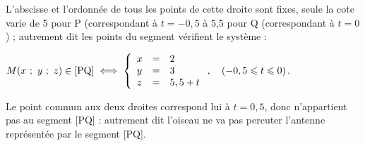 \begin{enumerate}
L'abscisse et l'ordonnée de tous les points de cette droite sont fixes, seule la cote varie de 5 pour P (correspondant à $t = -0,5$ à 5,5 pour Q (correspondant à $t = 0$) ; autrement dit les points du segment vérifient le système :

$M(x~;~y~;~z) \in [\text{PQ}] \iff \left\{\begin{array}{l c l}
x &=& 2\\
y &=&3\\
z &=&5,5 + t
\end{array}\right., \quad (-0,5 \leqslant t \leqslant 0)$.

Le point commun aux deux droites correspond lui à $t = 0,5$, donc n'appartient pas au segment [PQ] : autrement dit l'oiseau ne va pas percuter l'antenne représentée par le segment [PQ].

\end{enumerate}

\bigskip

